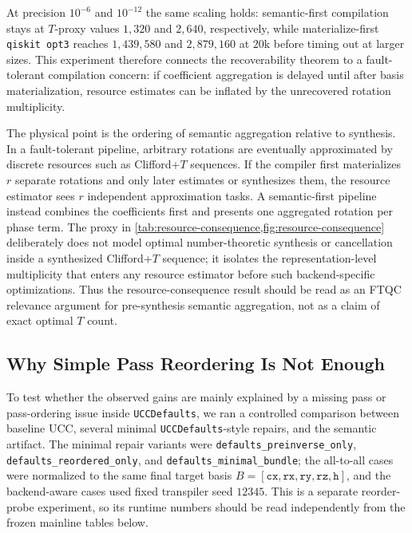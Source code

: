\documentclass[11pt]{article}
\begin{document}
At precision $10^{-6}$ and $10^{-12}$ the same scaling holds: semantic-first
compilation stays at $T$-proxy values $1{,}320$ and $2{,}640$, respectively,
while materialize-first \texttt{qiskit opt3} reaches $1{,}439{,}580$ and
$2{,}879{,}160$ at $20$k before timing out at larger sizes. This experiment
therefore connects the recoverability theorem to a fault-tolerant compilation
concern: if coefficient aggregation is delayed until after basis
materialization, resource estimates can be inflated by the unrecovered
rotation multiplicity.

The physical point is the ordering of semantic aggregation relative to
synthesis. In a fault-tolerant pipeline, arbitrary rotations are eventually
approximated by discrete resources such as Clifford+$T$ sequences. If the
compiler first materializes $r$ separate rotations and only later estimates or
synthesizes them, the resource estimator sees $r$ independent approximation
tasks. A semantic-first pipeline instead combines the coefficients first and
presents one aggregated rotation per phase term. The proxy in
\cref{tab:resource-consequence,fig:resource-consequence} deliberately does not
model optimal number-theoretic synthesis or cancellation inside a synthesized
Clifford+$T$ sequence; it isolates the representation-level multiplicity that
enters any resource estimator before such backend-specific optimizations.
Thus the resource-consequence result should be read as an FTQC relevance
argument for pre-synthesis semantic aggregation, not as a claim of exact
optimal $T$ count.

\subsection{Why Simple Pass Reordering Is Not Enough}

To test whether the observed gains are mainly explained by a missing pass or
pass-ordering issue inside \texttt{UCCDefaults}, we ran a controlled comparison
between baseline UCC, several minimal \texttt{UCCDefaults}-style repairs, and the
semantic artifact. The minimal repair variants were
\texttt{defaults\_preinverse\_only}, \texttt{defaults\_reordered\_only}, and
\texttt{defaults\_minimal\_bundle}; the all-to-all cases were normalized to the
same final target basis $B = [\texttt{cx},\texttt{rx},\texttt{ry},\texttt{rz},\texttt{h}]$,
and the backend-aware cases used fixed transpiler seed $12345$. This is a
separate reorder-probe experiment, so its runtime numbers should be read
independently from the frozen mainline tables below.
\end{document}
